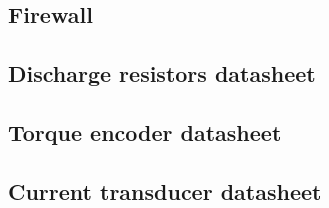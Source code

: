 \subsection{Firewall}

\subsection{Discharge resistors datasheet}\label{app:discharge_resistor_sheet}
	

\subsection{Torque encoder datasheet}\label{app:torque_encoder_datasheet}
	

\subsection{Current transducer datasheet}\label{app:bspd_lem_datasheet}

